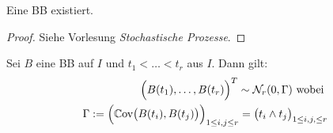 \begin{satz}[Lévy]\label{satz7.13Levy}
Eine BB existiert.
\end{satz}
\begin{proof}
Siehe Vorlesung \textit{Stochastische Prozesse}.
\end{proof}

\begin{lemma}\label{lemma7.14}
Sei $B$ eine BB auf $I$ und $t_1<\ldots<t_r$ aus $I$. Dann gilt:
\begin{align*}
\Big(B(t_1),\ldots, B(t_r)\Big)^T\sim\mathcal{N}_r(0,\Gamma)\text{ wobei }\\
\Gamma:=\Big(\mathbb{C}\text{ov}\big(B(t_i),B(t_j)\big)\Big)_{1\leq i,j\leq r}=\big(t_i\wedge t_j\big)_{1\leq i,j,\leq r}
\end{align*}
\end{lemma}


